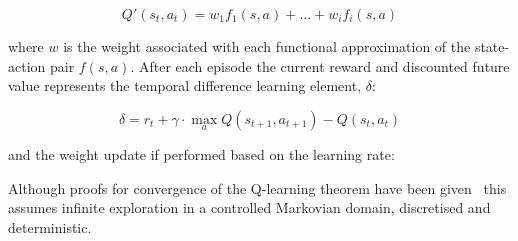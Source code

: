 \documentclass[letterpaper, 10 pt, journal, twoside]{IEEEtran}
\begin{document}
\begin{equation*}
Q'(s_t, a_t) = w_1f_1(s,a)+...+w_if_i(s,a)
\end{equation*}

where $w$ is the weight associated with each functional approximation of the state-action pair $f(s,a)$. After each episode the current reward and discounted future value represents the temporal difference learning element, $\delta$:

\begin{equation*}
\delta = r_t + \gamma \cdot \max_{a} Q(s_{t+1}, a_{t+1}) - Q(s_t,a_t)
\end{equation*}

and the weight update if performed based on the learning rate:




Although proofs for convergence of the Q-learning theorem have been given~\cite{watkins1992q,melo2001convergence} this assumes infinite exploration in a controlled Markovian domain, discretised and deterministic.
 

\end{document}
